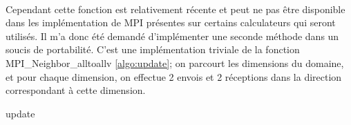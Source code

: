 \paragraph{}Cependant cette fonction est relativement récente et peut ne pas être disponible dans les implémentation de MPI présentes sur certains calculateurs qui seront utilisés. Il m'a donc été demandé d'implémenter une seconde méthode dans un soucis de portabilité. C'est une implémentation triviale de la fonction MPI\_Neighbor\_alltoallv \ref{algo:update}; on parcourt les dimensions du domaine, et pour chaque dimension, on effectue 2 envois et 2 réceptions dans la direction correspondant à cette dimension.




\begin{algorithm}
  \caption{update}
  \label{algo:update}
  \begin{algorithmic}
    \ENDFOR
  \end{algorithmic}
\end{algorithm}




